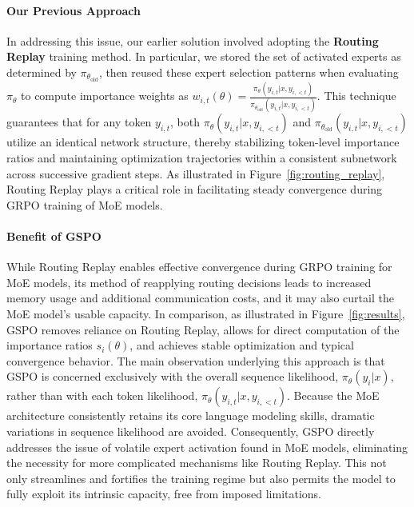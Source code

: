 \paragraph{Our Previous Approach} In addressing this issue, our earlier solution involved adopting the \textbf{Routing Replay} training method. In particular, we stored the set of activated experts as determined by $\pi_{\theta_\text{old}}$, then reused these expert selection patterns when evaluating $\pi_{\theta}$ to compute importance weights as $w_{i,t}(\theta) = \frac{ \pi_{\theta} (y_{i,t} | x, y_{i,<t}) }{ \pi_{\theta_\text{old}} (y_{i,t} | x,y_{i,<t})}$. This technique guarantees that for any token $y_{i,t}$, both $\pi_{\theta} (y_{i,t} | x, y_{i,<t})$ and $\pi_{\theta_\text{old}} (y_{i,t} | x,y_{i,<t})$ utilize an identical network structure, thereby stabilizing token-level importance ratios and maintaining optimization trajectories within a consistent subnetwork across successive gradient steps. As illustrated in Figure~\ref{fig:routing_replay}, Routing Replay plays a critical role in facilitating steady convergence during GRPO training of MoE models.

\paragraph{Benefit of GSPO} While Routing Replay enables effective convergence during GRPO training for MoE models, its method of reapplying routing decisions leads to increased memory usage and additional communication costs, and it may also curtail the MoE model’s usable capacity. In comparison, as illustrated in Figure~\ref{fig:results}, GSPO removes reliance on Routing Replay, allows for direct computation of the importance ratios $s_i(\theta)$, and achieves stable optimization and typical convergence behavior. The main observation underlying this approach is that GSPO is concerned exclusively with the overall sequence likelihood, $\pi_{\theta} (y_i | x)$, rather than with each token likelihood, $\pi_{\theta} (y_{i,t} | x, y_{i,<t})$. Because the MoE architecture consistently retains its core language modeling skills, dramatic variations in sequence likelihood are avoided. Consequently, GSPO directly addresses the issue of volatile expert activation found in MoE models, eliminating the necessity for more complicated mechanisms like Routing Replay. This not only streamlines and fortifies the training regime but also permits the model to fully exploit its intrinsic capacity, free from imposed limitations.

